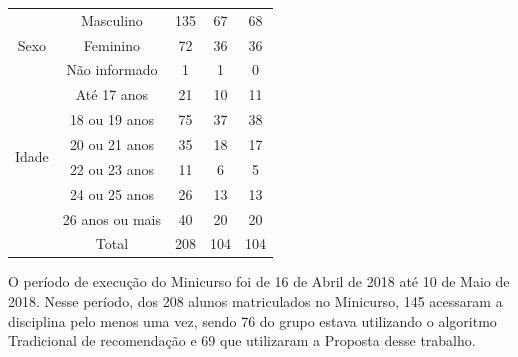 \begin{table}[ht]
\begin{tabular}{ccccc}
  \hline
  \multirow{3}{*}{Sexo}                 & Masculino                & 135                                       & 67                   & 68                              \\
                                        & Feminino                 & 72                                        & 36                   & 36                              \\
                                        & Não informado            & 1                                         & 1                    & 0                               \\
  \hline
  \multirow{6}{*}{Idade}                & Até 17 anos              & 21                                        & 10                   & 11                              \\
                                        & 18 ou 19 anos            & 75                                        & 37                   & 38                              \\
                                        & 20 ou 21 anos            & 35                                        & 18                   & 17                              \\
                                        & 22 ou 23 anos            & 11                                        & 6                    & 5                               \\
                                        & 24 ou 25 anos            & 26                                        & 13                   & 13                              \\
                                        & 26 anos ou mais          & 40                                        & 20                   & 20                              \\
  \hline
                                        & Total                    & 208                                       & 104                  & 104                             \\
  \hline
\end{tabular}
\end{table}

O período de execução do Minicurso foi de 16 de Abril de 2018 até 10 de Maio de 2018. Nesse período, dos 208 alunos
matriculados no Minicurso, 145 acessaram a disciplina pelo menos uma vez, sendo 76 do grupo estava
utilizando o algoritmo Tradicional de recomendação e 69 que utilizaram a Proposta desse trabalho.

